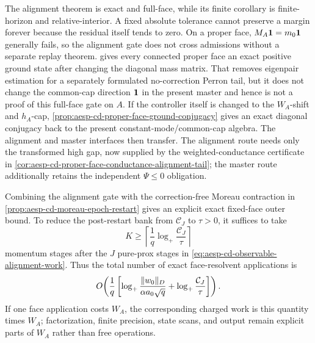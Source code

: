 The alignment theorem is exact and full-face, while its finite corollary is
finite-horizon and relative-interior.  A fixed absolute tolerance cannot
preserve a margin forever because the residual itself tends to zero.  On a
proper face, $M_A\mathbf{1}=m_0\mathbf{1}$ generally fails, so the alignment gate does not
cross admissions without a separate replay theorem.
 gives every
connected proper face an exact positive ground state after changing the
diagonal mass matrix.  That removes eigenpair estimation for a separately
formulated no-correction Perron tail, but it does not change the common-cap
direction \(\mathbf{1}\) in the present master and hence is not a proof of this
full-face gate on \(A\).
If the controller itself is changed to the \(W_A\)-shift and \(h_A\)-cap,
\cref{prop:aesp-cd-proper-face-ground-conjugacy} gives an exact diagonal
conjugacy back to the present constant-mode/common-cap algebra.  The
alignment and master interfaces then transfer.  The alignment route needs
only the transformed high gap, now supplied by the weighted-conductance
certificate in
\cref{cor:aesp-cd-proper-face-conductance-alignment-tail}; the master route
additionally retains the independent \(\Psi\leq0\) obligation.

Combining the alignment gate with the correction-free Moreau contraction in
\cref{prop:aesp-cd-moreau-epoch-restart} gives an explicit exact fixed-face
outer bound.  To reduce the post-restart bank from $\mathcal C_J$ to
$\tau>0$, it suffices to take
\begin{equation*}
 K\geq\left\lceil\frac1q\log_+\frac{\mathcal C_J}{\tau}\right\rceil
\end{equation*}
momentum stages after the $J$ pure-prox stages in
\cref{eq:aesp-cd-observable-alignment-work}.  Thus the total number of exact
face-resolvent applications is
\begin{equation*}
 O\!\left(\frac1q\left[
  \log_+\frac{\lVert w_0\rVert_D}{\alpha a_0\sqrt q}
  +\log_+\frac{\mathcal C_J}{\tau}
 \right]\right).
\end{equation*}
If one face application costs $W_A$, the corresponding charged work is this
quantity times $W_A$; factorization, finite precision, state scans, and output
remain explicit parts of $W_A$ rather than free operations.

